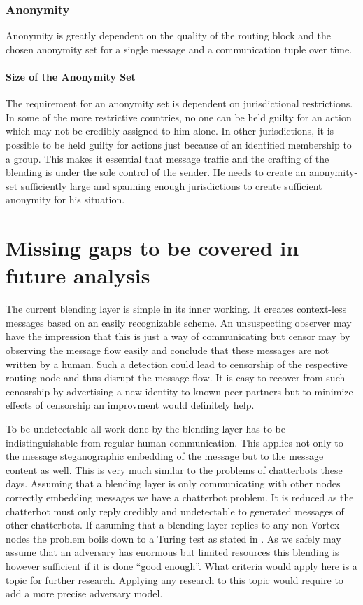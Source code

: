 \subsection{Anonymity}
Anonymity is greatly dependent on the quality of the routing block and the chosen anonymity set for a single message and a communication tuple over time. 

\subsubsection{Size of the Anonymity Set}
The requirement for an anonymity set is dependent on jurisdictional restrictions. In some of the more restrictive countries, no one can be held guilty for an action which may not be credibly assigned to him alone. In other jurisdictions, it is possible to be held guilty for actions just because of an identified membership to a group. This makes it essential that message traffic and the crafting of the blending is under the sole control of the sender. He needs to create an anonymity-set sufficiently large and spanning enough jurisdictions to create sufficient anonymity for his situation.

\chapter{Missing gaps to be covered in future analysis}
The current blending layer is simple in its inner working. It creates context-less messages based on an easily recognizable scheme. An unsuspecting observer may have the impression that this is just a way of communicating but censor may by observing the message flow easily and conclude that these messages are not written by a human. Such a detection could lead to censorship of the respective routing node and thus disrupt the message flow. It is easy to recover from such cenosrship by advertising a new identity to known peer partners but to minimize effects of censorship an improvment would definitely help.

To be undetectable all work done by the blending layer has to be indistinguishable from regular human communication. This applies not only to the message steganographic embedding of the message but to the message content as well. This is very much similar to the problems of chatterbots these days. Assuming that a blending layer is only communicating with other nodes correctly embedding messages we have a chatterbot problem. It is reduced as the chatterbot must only reply credibly and undetectable to generated messages of other chatterbots. If assuming that a blending layer replies to any non-Vortex nodes the problem boils down to a Turing test as stated in \cite{turing1950computing}. As we safely may assume that an adversary has enormous but limited resources this blending is however sufficient if it is done ``good enough''. What criteria would apply here is a topic for further research. Applying any research to this topic would require to add a more precise adversary model.

